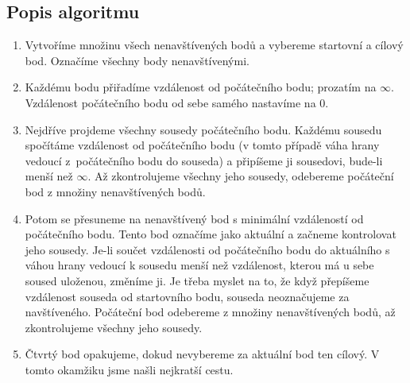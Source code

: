 \subsection{Popis algoritmu}
\label{subsec:popis-algoritmu}

\begin{enumerate}
    \item Vytvoříme množinu všech nenavštívených bodů a vybereme startovní a cílový bod. Označíme všechny body nenavštívenými. 
    \item Každému bodu přiřadíme vzdálenost od počátečního bodu; prozatím na $\infty$. Vzdálenost počátečního bodu od sebe samého nastavíme na $0$. 
    \item Nejdříve projdeme všechny sousedy počátečního bodu. Každému sousedu spočítáme vzdálenost od počátečního bodu (v tomto případě váha hrany vedoucí z~počátečního bodu do souseda) a připíšeme ji sousedovi, bude-li menší než $\infty$. Až zkontrolujeme všechny jeho sousedy, odebereme počáteční bod z množiny nenavštívených bodů.
    \item Potom se přesuneme na nenavštívený bod s minimální vzdáleností od počátečního bodu. 
    Tento bod označíme jako aktuální a začneme kontrolovat jeho sousedy. 
    Je-li součet vzdálenosti od počátečního bodu do aktuálního s váhou hrany vedoucí k sousedu menší než vzdálenost, kterou má u sebe soused uloženou, změníme ji.
    Je třeba myslet na to, že když přepíšeme vzdálenost souseda od startovního bodu, souseda neoznačujeme za navštíveného. Počáteční bod odebereme z množiny nenavštívených bodů, až zkontrolujeme všechny jeho sousedy.
    \item Čtvrtý bod opakujeme, dokud nevybereme za aktuální bod ten cílový. V tomto okamžiku jsme našli nejkratší cestu.
\end{enumerate}